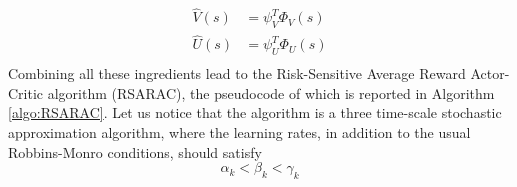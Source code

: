 \begin{equation}
	\begin{split}
		\widehat{V}(s) &= \psi_V^T \Phi_V(s)\\
		\widehat{U}(s) &= \psi_U^T \Phi_U(s)\\
	\end{split}
\end{equation}
Combining all these ingredients lead to the Risk-Sensitive Average Reward Actor-Critic algorithm (RSARAC), the pseudocode of which is reported in Algorithm \ref{algo:RSARAC}.
Let us notice that the algorithm is a three time-scale stochastic approximation algorithm, where the learning rates, in addition to the usual Robbins-Monro conditions, should satisfy
\begin{equation*}
	\alpha_k < \beta_k < \gamma_k
\end{equation*}

